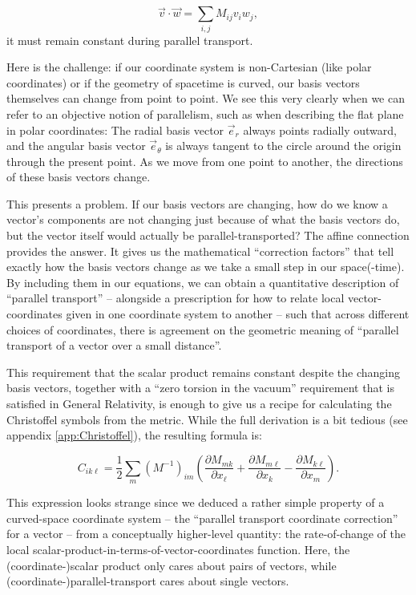 \documentclass[twocolumn]{article}
\begin{document}
\begin{equation}
\vec{v} \cdot \vec{w} = \sum_{i,j} M_{ij} v_i w_j,
\end{equation}
%
it must remain constant during parallel transport.

Here is the challenge: if our coordinate system is non-Cartesian (like
polar coordinates) or if the geometry of spacetime is curved, our
basis vectors themselves can change from point to point. We see this
very clearly when we can refer to an objective notion of parallelism,
such as when describing the flat plane in polar coordinates:
The radial basis vector \(\vec{e}_r\) always
points radially outward, and the angular basis
vector \(\vec{e}_\theta\) is always tangent to the circle around the
origin through the present point. As we move from one point to
another, the directions of these basis vectors change.

This presents a problem. If our basis vectors are changing, how do we
know a vector's components are not changing just because of what the
basis vectors do, but the vector itself would actually be
parallel-transported? The affine connection provides the answer. It
gives us the mathematical ``correction factors'' that tell exactly how
the basis vectors change as we take a small step in our
space(-time). By including them in our equations, we can obtain a
quantitative description of ``parallel transport'' -- alongside a
prescription for how to relate local vector-coordinates given in one
coordinate system to another -- such that across different choices of
coordinates, there is agreement on the geometric meaning of ``parallel
transport of a vector over a small distance''.

This requirement that the scalar product remains constant despite the
changing basis vectors, together with a ``zero torsion in the vacuum''
requirement that is satisfied in General Relativity, is enough to give
us a recipe for calculating the Christoffel symbols from the
metric. While the full derivation is a bit tedious
(see appendix \ref{app:Christoffel}), the resulting formula is:

\begin{equation}C_{ik\ell} = \frac{1}{2} \sum_m (M^{-1})_{im} \left( \frac{\partial M_{mk}}{\partial x_\ell} + \frac{\partial M_{m\ell}}{\partial x_k} - \frac{\partial M_{k\ell}}{\partial x_m} \right).\end{equation}

This expression looks strange since we deduced a rather simple
property of a curved-space coordinate system -- the ``parallel
transport coordinate correction'' for a vector -- from a conceptually
higher-level quantity: the rate-of-change of the local
scalar-product-in-terms-of-vector-coordinates function. Here, the
(coordinate-)scalar product only cares about pairs of vectors, while
(coordinate-)parallel-transport cares about single vectors.
\end{document}
